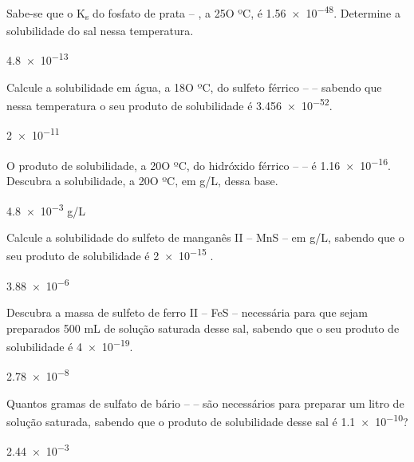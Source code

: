 \documentclass[11pt]{scrartcl}
\begin{document}
\begin{exercise}
Sabe-se que o K\textsubscript{s} do fosfato de prata – , a 25O ºC, é \num{1.56e-48}. Determine a solubilidade do sal nessa temperatura.
\end{exercise}
\begin{solution}
\num{4.8e-13}
\end{solution}


\begin{exercise}
Calcule a solubilidade em água, a 18O ºC, do sulfeto férrico –  – sabendo que nessa temperatura o seu produto de solubilidade é \num{3.456e-52}.
\end{exercise}
\begin{solution}
\num{2e-11}
\end{solution}


\begin{exercise}
O produto de solubilidade, a 20O ºC, do hidróxido férrico –  – é \num{1.16e-16}. Descubra a solubilidade, a 20O ºC, em g/L, dessa base.
\end{exercise}
\begin{solution}
\num{4.8e-3} g/L
\end{solution}

\begin{exercise}
Calcule a solubilidade do sulfeto de manganês II – MnS – em g/L, sabendo que o seu produto de solubilidade é \num{2e-15} .
\end{exercise}
\begin{solution}
\num{3.88e-6}
\end{solution}


\begin{exercise}
Descubra a massa de sulfeto de ferro II – FeS – necessária para que sejam preparados 500 mL de solução saturada desse sal, sabendo que o seu produto de solubilidade é \num{4e-19}.
\end{exercise}
\begin{solution}
\num{2.78e-8}
\end{solution}

\begin{exercise}
Quantos gramas de sulfato de bário –  – são necessários para preparar um litro de solução saturada, sabendo que o produto de solubilidade desse sal é \num{1.1e-10}?
\end{exercise}
\begin{solution}
\num{2.44e-3}
\end{solution}
\end{document}

